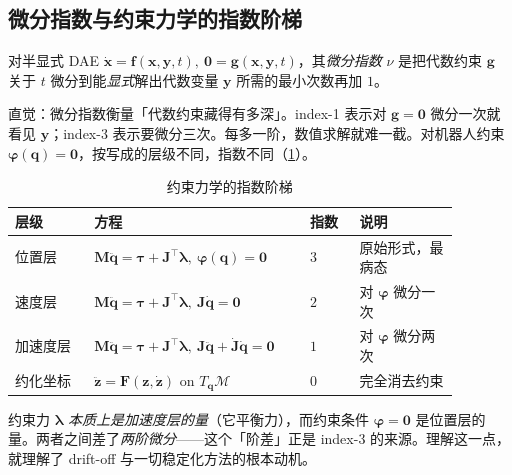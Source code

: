 \subsection{微分指数与约束力学的指数阶梯}
\begin{definition}\label{def:cd-index}
对半显式 DAE $\dot{\mathbf x}=\mathbf f(\mathbf x,\mathbf y,t),\ \mathbf 0=\mathbf g(\mathbf x,\mathbf y,t)$，其\emph{微分指数} $\nu$ 是把代数约束 $\mathbf g$ 关于 $t$ 微分到能\emph{显式}解出代数变量 $\mathbf y$ 所需的最小次数再加 $1$。
\end{definition}
\noindent 直觉：微分指数衡量「代数约束藏得有多深」。index-1 表示对 $\mathbf g=\mathbf 0$ 微分一次就看见 $\mathbf y$；index-3 表示要微分三次。每多一阶，数值求解就难一截。对机器人约束 $\boldsymbol\varphi(\mathbf q)=\mathbf 0$，按写成的层级不同，指数不同（\cref{tab:cd-ladder}）。

\begin{table}[H]\centering\small
\caption{约束力学的指数阶梯}
\label{tab:cd-ladder}
\begin{tabular}{p{0.16\linewidth}p{0.42\linewidth}p{0.10\linewidth}p{0.20\linewidth}}
\toprule
层级 & 方程 & 指数 & 说明 \\
\midrule
位置层 & $\mathbf M\ddot{\mathbf q}=\boldsymbol\tau+\mathbf J^\top\boldsymbol\lambda,\ \boldsymbol\varphi(\mathbf q)=\mathbf 0$ & $3$ & 原始形式，最病态 \\
速度层 & $\mathbf M\ddot{\mathbf q}=\boldsymbol\tau+\mathbf J^\top\boldsymbol\lambda,\ \mathbf J\dot{\mathbf q}=\mathbf 0$ & $2$ & 对 $\boldsymbol\varphi$ 微分一次 \\
加速度层 & $\mathbf M\ddot{\mathbf q}=\boldsymbol\tau+\mathbf J^\top\boldsymbol\lambda,\ \mathbf J\ddot{\mathbf q}+\dot{\mathbf J}\dot{\mathbf q}=\mathbf 0$ & $1$ & 对 $\boldsymbol\varphi$ 微分两次 \\
约化坐标 & $\ddot{\mathbf z}=\mathbf F(\mathbf z,\dot{\mathbf z})$ on $T_{\mathbf q}\mathcal M$ & $0$ & 完全消去约束 \\
\bottomrule
\end{tabular}
\end{table}

\begin{insight}
约束力 $\boldsymbol\lambda$ \emph{本质上是加速度层的量}（它平衡力），而约束条件 $\boldsymbol\varphi=\mathbf 0$ 是位置层的量。两者之间差了\emph{两阶微分}——这个「阶差」正是 index-3 的来源。理解这一点，就理解了 drift-off 与一切稳定化方法的根本动机。
\end{insight}

